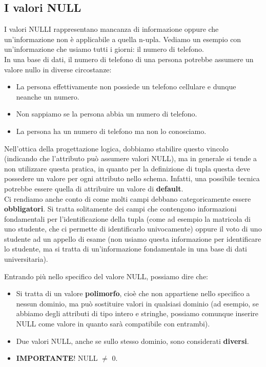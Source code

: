 \documentclass[12pt]{report}
\begin{document}
	\subsection{I valori NULL}
	I valori NULLI rappresentano mancanza di informazione oppure che un'informazione non è applicabile a quella n-upla. Vediamo un esempio con un'informazione che usiamo tutti i giorni: il numero di telefono.\\
	In una base di dati, il numero di telefono di una persona potrebbe assumere un valore nullo in diverse circostanze:
	\begin{itemize}
		\item La persona effettivamente non possiede un telefono cellulare e dunque neanche un numero.
		
		\item Non sappiamo se la persona abbia un numero di telefono.
		
		\item La persona ha un numero di telefono ma non lo conosciamo.
	\end{itemize}
	Nell'ottica della progettazione logica, dobbiamo stabilire questo vincolo (indicando che l'attributo può assumere valori NULL), ma in generale si tende a non utilizzare questa pratica, in quanto per la definizione di tupla questa deve possedere un valore per ogni attributo nello schema. Infatti, una possibile tecnica potrebbe essere quella di attribuire un valore di \textbf{default}.\\
	Ci rendiamo anche conto di come molti campi debbano categoricamente essere \textbf{obbligatori}. Si tratta solitamente dei campi che contengono informazioni fondamentali per l'identificazione della tupla (come ad esempio la matricola di uno studente, che ci permette di identificarlo univocamente) oppure il voto di uno studente ad un appello di esame (non usiamo questa informazione per identificare lo studente, ma si tratta di un'informazione fondamentale in una base di dati universitaria).
	\smallbreak
	
	Entrando più nello specifico del valore NULL, possiamo dire che:
	\begin{itemize}
		\item Si tratta di un valore \textbf{polimorfo}, cioè che non appartiene nello specifico a nessun dominio, ma può sostituire valori in qualsiasi dominio (ad esempio, se abbiamo degli attributi di tipo intero e stringhe, possiamo comunque inserire NULL come valore in quanto sarà compatibile con entrambi).
		
		\item Due valori NULL, anche se sullo stesso dominio, sono considerati \textbf{diversi}.
		
		\item \textbf{IMPORTANTE}! NULL $\neq$ 0.
	\end{itemize}
	
\end{document}
